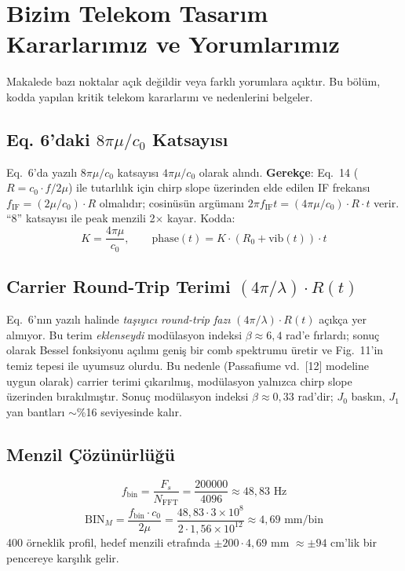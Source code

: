 \documentclass[11pt,a4paper]{article}
\begin{document}
\section{Bizim Telekom Tasarım Kararlarımız ve Yorumlarımız}
Makalede bazı noktalar açık değildir veya farklı yorumlara açıktır. Bu bölüm, kodda yapılan
kritik telekom kararlarını ve nedenlerini belgeler.

\subsection{Eq. 6'daki $8\pi\mu/c_0$ Katsayısı}
Eq.~6'da yazılı $8\pi\mu/c_0$ katsayısı $4\pi\mu/c_0$ olarak alındı.
\textbf{Gerekçe}: Eq.~14 ($R = c_0 \cdot f / 2\mu$) ile tutarlılık için chirp slope üzerinden
elde edilen IF frekansı $f_{\text{IF}} = (2\mu/c_0)\cdot R$ olmalıdır; cosinüsün argümanı
$2\pi f_{\text{IF}} t = (4\pi\mu/c_0)\cdot R\cdot t$ verir. ``8'' katsayısı ile peak menzili
2$\times$ kayar. Kodda:
\begin{equation*}
K = \frac{4\pi\mu}{c_0}, \qquad \text{phase}(t) = K\cdot(R_0 + \text{vib}(t))\cdot t
\end{equation*}

\subsection{Carrier Round-Trip Terimi $(4\pi/\lambda)\cdot R(t)$}
Eq.~6'nın yazılı halinde \emph{taşıyıcı round-trip fazı} $(4\pi/\lambda)\cdot R(t)$ açıkça yer almıyor.
Bu terim \emph{eklenseydi} modülasyon indeksi $\beta \approx 6{,}4$ rad'e fırlardı; sonuç olarak
Bessel fonksiyonu açılımı geniş bir comb spektrumu üretir ve Fig.~11'in temiz tepesi ile uyumsuz
olurdu. Bu nedenle (Passafiume vd.~[12] modeline uygun olarak) carrier terimi çıkarılmış,
modülasyon yalnızca chirp slope üzerinden bırakılmıştır. Sonuç modülasyon indeksi
$\beta \approx 0{,}33$ rad'dir; $J_0$ baskın, $J_1$ yan bantları $\sim$\%16 seviyesinde kalır.

\subsection{Menzil Çözünürlüğü}
\begin{equation}
f_{\text{bin}} = \frac{F_s}{N_{\text{FFT}}} = \frac{200000}{4096} \approx 48{,}83 \text{ Hz}
\end{equation}
\begin{equation}
\text{BIN}_M = \frac{f_{\text{bin}} \cdot c_0}{2\mu} = \frac{48{,}83 \cdot 3\times10^8}{2 \cdot 1{,}56\times10^{12}}
\approx 4{,}69 \text{ mm/bin}
\end{equation}
400 örneklik profil, hedef menzili etrafında $\pm 200 \cdot 4{,}69$ mm $\approx \pm 94$ cm'lik bir
pencereye karşılık gelir.
\end{document}
